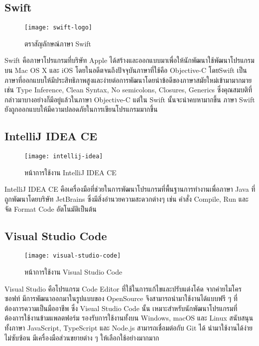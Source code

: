     \subsection{Swift}
        \begin{figure}[H]
            \centering
            \texttt{[image: swift-logo]}
            \caption{ตราสัญลักษณ์ภาษา Swift}\label{swift-logo}
        \end{figure}
        Swift คือภาษาโปรแกรมที่บริษัท Apple ได้สร้างและออกแบบมาเพื่อให้นักพัฒนาใช้พัฒนาโปรแกรมบน Mac OS X และ iOS โดยในอดีตจนถึงปัจจุบันภาษาที่ใช้คือ Objective-C โดยSwift เป็นภาษาที่ออกแบบให้มีประสิทธิภาพสูงและง่ายต่อการพัฒนาโดยนำข้อดีของภาษาสมัยใหม่เข้ามามากมาย เช่น Type Inference, Clean Syntax, No semicolons, Closures, Generics ซึ่งคุณสมบติที่กล่าวมาบางอย่างก็มีอยู่แล้วในภาษา Objective-C แต่ใน Swift นั้นจะน่าคบหามากขึ้น ภาษา Swift ยังถูกออกแบบให้มีความปลอดภัยในการเขียนโปรแกรมมากขึ้น\cite{swift}

    \subsection{IntelliJ IDEA CE}
        \begin{figure}[H]
            \centering
            \texttt{[image: intellij-idea]}
            \caption{หน้าการใช้งาน IntelliJ IDEA CE}\label{intellij-idea}
        \end{figure}
        IntelliJ IDEA CE คือเครื่องมือที่ช่วยในการพัฒนาโปรแกรมที่พื้นฐานการทำงานเพื่อภาษา Java ที่ถูกพัฒนาโดยบริษัท JetBrains ซึ่งมีสิ่งอำนวยความสะดวกต่างๆ เช่น คำสั่ง Compile, Run และจัด Format Code อัตโนมัติเป็นต้น

    \subsection{Visual Studio Code}
        \begin{figure}[H]
            \centering
            \texttt{[image: visual-studio-code]}
            \caption{หน้าการใช้งาน Visual Studio Code}\label{visual-studio-code}
        \end{figure}
        Visual Studio คือโปรแกรม Code Editor ที่ใช้ในการแก้ไขและปรับแต่งโค้ด จากค่ายไมโครซอฟท์ มีการพัฒนาออกมาในรูปแบบของ OpenSource จึงสามารถนำมาใช้งานได้แบบฟรี ๆ ที่ต้องการความเป็นมืออาชีพ
        ซึ่ง Visual Studio Code นั้น เหมาะสำหรับนักพัฒนาโปรแกรมที่ต้องการใช้งานข้ามแพลตฟอร์ม รองรับการใช้งานทั้งบน Windows, macOS และ Linux สนับสนุนทั้งภาษา JavaScript, TypeScript และ Node.js 
        สามารถเชื่อมต่อกับ Git ได้ นำมาใช้งานได้ง่ายไม่ซับซ้อน มีเครื่องมือส่วนขยายต่าง ๆ ให้เลือกใช้อย่างมากมาก

